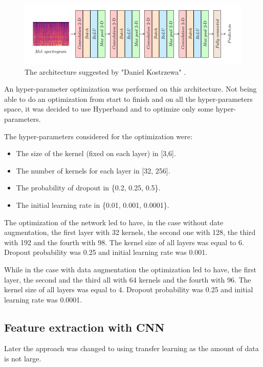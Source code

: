 \begin{figure}[ht]
    \centering
    \includegraphics[scale=0.6]{images/CNN-architecture.png}
    \caption{The architecture suggested by "Daniel Kostrzewa" \cite{kostrzewa2021music}.}
    \label{fig:CNN-architecture}
\end{figure}

An hyper-parameter optimization was performed on this architecture.
Not being able to do an optimization from start to finish and on all the hyper-parameters space,
it was decided to use Hyperband \cite{li2016novel} and to optimize only some hyper-parameters.

The hyper-parameters considered for the optimization were:
\begin{itemize}
    \item The size of the kernel (fixed on each layer) in [3,6].
    \item The number of kernels for each layer in [32, 256].
    \item The probability of dropout in \{0.2, 0.25, 0.5\}.
    \item The initial learning rate in \{0.01, 0.001, 0.0001\}.
\end{itemize}

The optimization of the network led to have, in the case without date augmentation, the first layer with 32 kernels, the second one with 128, the third with 192 and the fourth with 98. The kernel size of all layers was equal to 6.
Dropout probability was 0.25 and initial learning rate was 0.001.

While in the case with data augmentation the optimization led to have, the first layer, the second and the third all with 64 kernels and the fourth with 96.
The kernel size of all layers was equal to 4. Dropout probability was 0.25 and initial learning rate was 0.0001.

\subsection{Feature extraction with CNN}
Later the approach was changed to using transfer learning as the amount of data is not large.

